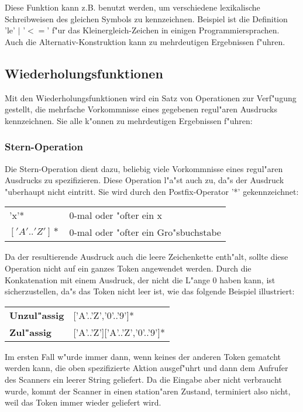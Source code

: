 \medskip

Diese Funktion kann z.B. benutzt werden, um verschiedene lexikalische Schreibweisen
des gleichen Symbols zu kennzeichnen. Beispiel ist die Definition 'le' $\mid$ 
'$<=$' f"ur das Kleinergleich-Zeichen in einigen Programmiersprachen. Auch die
Alternativ-Konstruktion kann zu mehrdeutigen Ergebnissen f"uhren.
\subsection{Wiederholungsfunktionen}
Mit den Wiederholungsfunktionen wird ein Satz von Operationen zur Verf"ugung
gestellt, die mehrfache Vorkommnisse eines gegebenen regul"aren Ausdrucks
kennzeichnen. Sie alle k"onnen zu mehrdeutigen Ergebnissen f"uhren:
\subsubsection{Stern-Operation}
Die Stern-Operation dient dazu, beliebig viele Vorkommnisse eines regul"aren
Ausdrucks zu spezifizieren. Diese Operation l"a"st auch zu, da"s der Ausdruck
"uberhaupt nicht eintritt. Sie wird durch den Postfix-Operator '*' gekennzeichnet:

\medskip

\begin{tabular}{ll}
'x'*&0-mal oder "ofter ein x\\
$['A'..'Z']*$&0-mal oder "ofter ein Gro"sbuchstabe\\
\end{tabular}

\medskip

Da der resultierende Ausdruck auch die leere Zeichenkette enth"alt, sollte diese
Operation nicht auf ein ganzes Token angewendet werden. Durch die Konkatenation mit
einem Ausdruck, der nicht die L"ange 0 haben kann, ist sicherzustellen, da"s das
Token nicht leer ist, wie das folgende Beispiel illustriert:

\medskip

\begin{tabular}{ll}
{\bf Unzul"assig}&['A'..'Z','0'..'9']*\\
{\bf Zul"assig}&['A'..'Z']['A'..'Z','0'..'9']*\\
\end{tabular}

\medskip

Im ersten Fall w"urde immer dann, wenn keines der anderen Token gematcht werden
kann, die oben spezifizierte Aktion ausgef"uhrt und dann dem Aufrufer des Scanners
ein leerer String geliefert. Da die Eingabe aber nicht verbraucht wurde, kommt der
Scanner in einen station"aren Zustand, terminiert also nicht, weil das Token immer
wieder geliefert wird.

